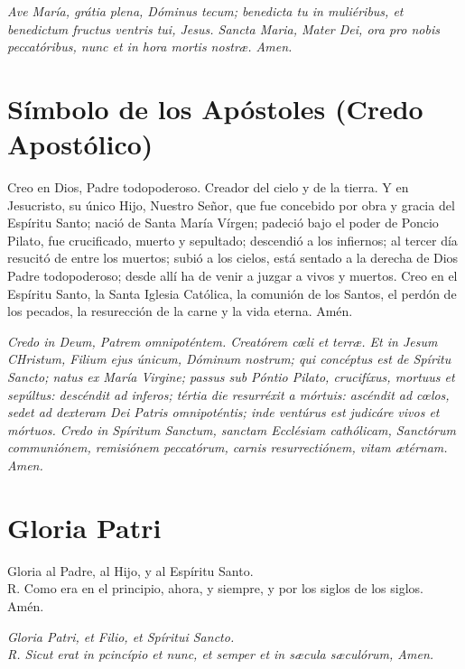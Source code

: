 \documentclass[a4paper,11pt, oneside]{report}
\begin{document}
      \medskip

      \textit{Ave María, grátia plena, Dóminus tecum; benedicta tu in muliéribus, et benedictum fructus ventris tui, Jesus.
      Sancta Maria, Mater Dei, ora pro nobis peccatóribus, nunc et in hora mortis nostr{\ae}. Amen.}\cite{frater:oraciones}

    \section{Símbolo de los Apóstoles (Credo Apostólico)}

      Creo en Dios, Padre todopoderoso. Creador del cielo y de la tierra. Y en Jesucristo, su único Hijo, Nuestro Señor, que fue concebido por
      obra y gracia del Espíritu Santo; nació de Santa María Vírgen; padeció bajo el poder de Poncio Pilato, fue crucificado, muerto y sepultado;
      descendió a los infiernos; al tercer día resucitó de entre los muertos; subió a los cielos, está sentado a la derecha de Dios Padre todopoderoso;
      desde allí ha de venir a juzgar a vivos y muertos. Creo en el Espíritu Santo, la Santa Iglesia Católica, la comunión de los Santos, el perdón
      de los pecados, la resurección de la carne y la vida eterna. Amén.

      \medskip

      \textit{Credo in Deum, Patrem omnipoténtem. Creatórem c{\oe}li et terr{\ae}. Et in Jesum CHristum, Filium ejus únicum, Dóminum nostrum; qui concéptus
      est de Spíritu Sancto; natus ex María Virgine; passus sub Póntio Pilato, crucifíxus, mortuus et sepúltus: descéndit ad inferos; tértia die resurréxit
      a mórtuis: ascéndit ad c{\oe}los, sedet ad dexteram Dei Patris omnipoténtis; inde ventúrus est judicáre vivos et mórtuos. Credo in Spíritum Sanctum,
      sanctam Ecclésiam cathólicam, Sanctórum communiónem, remisiónem peccatórum, carnis resurrectiónem, vitam {\ae}térnam. Amen.}\cite{frater:oraciones}

    \section{Gloria Patri}

      \noindent Gloria al Padre, al Hijo, y al Espíritu Santo.\\
      R. Como era en el principio, ahora, y siempre, y por los siglos de los siglos. Amén.

      \medskip

      \noindent \textit{Gloria Patri, et Filio, et Spíritui Sancto.\\
      R. Sicut erat in pcincípio et nunc, et semper et in s{\ae}cula s{\ae}culórum, Amen.}\cite{frater:oraciones}
\end{document}
